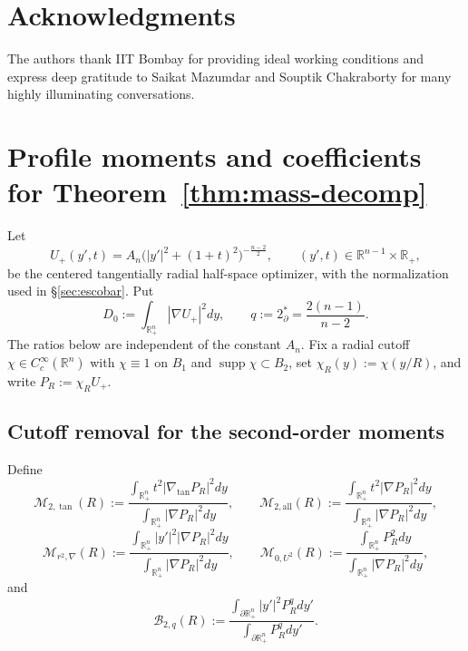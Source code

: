 \documentclass[11pt,reqno,a4paper]{amsart}
\newcommand{\R}{\mathbb{R}}
\numberwithin{equation}{section}
\theoremstyle{plain}
\theoremstyle{remark}
\theoremstyle{plain}
\begin{document}
\section*{Acknowledgments}
The authors thank IIT Bombay for providing ideal working conditions and express deep gratitude to Saikat Mazumdar and Souptik Chakraborty for many highly illuminating conversations.

\appendix


\section{Profile moments and coefficients for \texorpdfstring{Theorem~\ref{thm:mass-decomp}}{the mass decomposition}}
\label{app:EW-moments}

Let
\[
U_+(y',t)=A_n\bigl(|y'|^2+(1+t)^2\bigr)^{-\frac{n-2}{2}},
\qquad (y',t)\in\R^{n-1}\times\R_+,
\]
be the centered tangentially radial half-space optimizer, with the normalization used in
\S\ref{sec:escobar}.  Put
\[
D_0:=\int_{\R^n_+}|\nabla U_+|^2dy,
\qquad q:=2^*_{\partial}=\frac{2(n-1)}{n-2}.
\]
The ratios below are independent of the constant $A_n$.  Fix a radial cutoff
$\chi\in C_c^\infty(\R^n)$ with $\chi\equiv1$ on $B_1$ and
$\operatorname{supp}\chi\subset B_2$, set $\chi_R(y):=\chi(y/R)$, and write
$P_R:=\chi_RU_+$.


\subsection*{Cutoff removal for the second-order moments}

Define
\[
\mathcal M_{2,\tan}(R):=
\frac{\displaystyle\int_{\R^n_+} t^{2}|\nabla_{\tan} P_R|^2dy}
{\displaystyle\int_{\R^n_+} |\nabla P_R|^2dy},
\qquad
\mathcal M_{2,\mathrm{all}}(R):=
\frac{\displaystyle\int_{\R^n_+} t^{2}|\nabla P_R|^2dy}
{\displaystyle\int_{\R^n_+} |\nabla P_R|^2dy},
\]
\[
\mathcal M_{r^2,\nabla}(R):=
\frac{\displaystyle\int_{\R^n_+} |y'|^2|\nabla P_R|^2dy}
{\displaystyle\int_{\R^n_+} |\nabla P_R|^2dy},
\qquad
\mathcal M_{0,U^2}(R):=
\frac{\displaystyle\int_{\R^n_+} P_R^2dy}
{\displaystyle\int_{\R^n_+} |\nabla P_R|^2dy},
\]
and
\[
\mathcal B_{2,q}(R):=
\frac{\displaystyle\int_{\partial\R^n_+}|y'|^2P_R^qdy'}
{\displaystyle\int_{\partial\R^n_+}P_R^qdy'}.
\]
\end{document}
